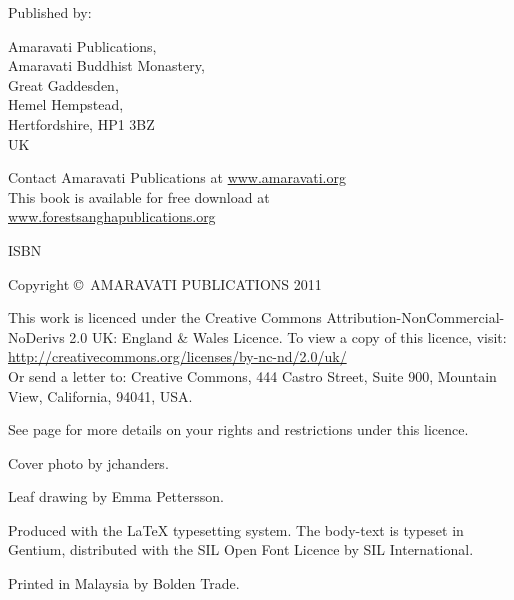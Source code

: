 {\smaller\setlength{\parskip}{0.8em}\setlength{\parindent}{0em}%
{\raggedright%

\bookTitle

Published by:

Amaravati Publications,\\
Amaravati Buddhist Monastery,\\
Great Gaddesden, \\
Hemel Hempstead, \\
Hertfordshire, HP1 3BZ\\
UK

Contact Amaravati Publications at \href{http://amaravati.org}{www.amaravati.org}\\
This book is available for free download at\\
\href{http://forestsanghapublications.org/}{www.forestsanghapublications.org}

ISBN \bookISBN

Copyright \copyright\ AMARAVATI PUBLICATIONS 2011

\vfill

{\tiny

This work is licenced under the Creative Commons Attribution-NonCommercial-NoDerivs 2.0 UK: England \& Wales Licence. To view a copy of this licence, visit:\\
\href{http://creativecommons.org/licenses/by-nc-nd/2.0/uk/}{http://creativecommons.org/licenses/by-nc-nd/2.0/uk/}\\
Or send a letter to: Creative Commons, 444 Castro Street, Suite 900, Mountain View, California, 94041, USA.

See page \pageref{cc-details} for more details on your rights and restrictions under this licence.

Cover photo by jchanders.

Leaf drawing by Emma Pettersson.

Produced with the {\selectfont\LaTeX} typesetting system. The body-text is typeset in Gentium, distributed with the SIL Open Font Licence by SIL International.

\editioninfo

Printed in Malaysia by Bolden Trade.

}

}}

